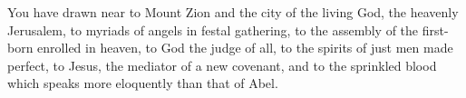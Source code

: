 \lettrine[lines=3]{Y}{}ou have drawn near to Mount Zion and the city of the living God, the heavenly Jerusalem, to myriads of angels in festal gathering, to the assembly of the first-born enrolled in heaven, to God the judge of all, to the spirits of just men made perfect, to Jesus, the mediator of a new covenant, and to the sprinkled blood which speaks more eloquently than that of Abel.
